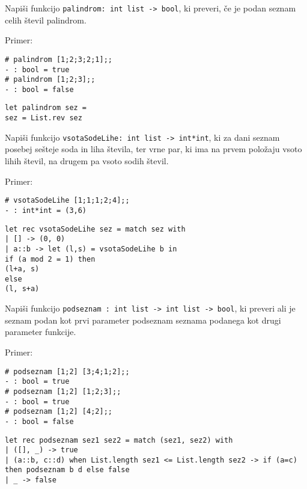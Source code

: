 \begin{ex}
Napi\v si funkcijo \lstinline{palindrom: int list -> bool}, ki preveri, \v ce je podan seznam celih \v stevil palindrom.

Primer: \begin{lstlisting}
# palindrom [1;2;3;2;1];;
- : bool = true
# palindrom [1;2;3];;
- : bool = false
\end{lstlisting}

\begin{sol}
\begin{lstlisting}
let palindrom sez =
sez = List.rev sez
\end{lstlisting}
\end{sol}

\end{ex}
\begin{ex}
Napi\v si funkcijo \lstinline{vsotaSodeLihe: int list -> int*int}, ki za dani seznam posebej se\v steje soda in liha \v stevila, ter vrne par, ki ima na prvem polo\v zaju vsoto lihih \v stevil, na drugem pa vsoto sodih \v stevil.

Primer: \begin{lstlisting}
# vsotaSodeLihe [1;1;1;2;4];;
- : int*int = (3,6)
\end{lstlisting}

\begin{sol}
\begin{lstlisting}
let rec vsotaSodeLihe sez = match sez with
| [] -> (0, 0)
| a::b -> let (l,s) = vsotaSodeLihe b in 
if (a mod 2 = 1) then 
(l+a, s) 
else 
(l, s+a)
\end{lstlisting}
\end{sol}

\end{ex}
\begin{ex}
Napi\v si funkcijo \lstinline{podseznam : int list -> int list -> bool}, ki preveri ali je seznam podan kot prvi parameter podseznam seznama podanega kot drugi parameter funkcije.

Primer: \begin{lstlisting}
# podseznam [1;2] [3;4;1;2];;
- : bool = true
# podseznam [1;2] [1;2;3];;
- : bool = true
# podseznam [1;2] [4;2];;
- : bool = false
\end{lstlisting}

\begin{sol}
\begin{lstlisting}
let rec podseznam sez1 sez2 = match (sez1, sez2) with
| ([], _) -> true
| (a::b, c::d) when List.length sez1 <= List.length sez2 -> if (a=c) then podseznam b d else false
| _ -> false
\end{lstlisting}
\end{sol}


\end{ex}
